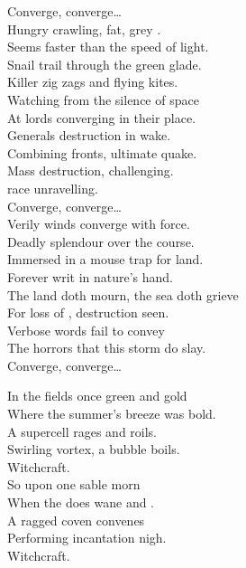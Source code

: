 Converge, converge… \\

Hungry crawling, fat, grey  . \\
Seems faster than the speed of light. \\
Snail trail through the green glade. \\
Killer zig zags and flying kites. \\
Watching from the silence of space \\
At lords converging in their place. \\
Generals destruction in wake. \\
Combining fronts, ultimate quake. \\

Mass destruction, challenging. \\
 race unravelling. \\

Converge, converge… \\

Verily winds converge with force. \\
Deadly splendour over the course. \\
Immersed in a mouse trap for land. \\
Forever writ in nature's hand. \\
The land doth mourn, the sea doth grieve \\
For loss of , destruction seen. \\
Verbose words fail to convey \\
The horrors that this storm do slay. \\

Converge, converge… \\




In the fields once green and gold \\
Where the summer's breeze was bold. \\
A supercell rages and roils. \\
Swirling vortex, a bubble boils. \\
Witchcraft. \\

So upon one sable morn \\
When the  does wane and . \\
A ragged coven convenes \\
Performing incantation nigh. \\
Witchcraft. \\

